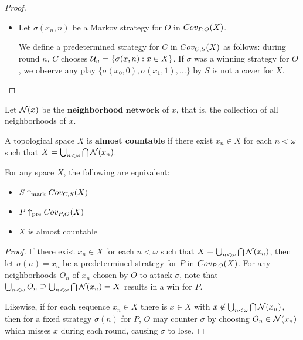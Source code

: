 \begin{proof}
\begin{itemize}
      \item
      Let $\sigma(x_n,n)$ be a Markov strategy for $O$ in $Cov_{P,O}(X)$.

      We define a predetermined strategy for $C$ in $Cov_{C,S}(X)$ as follows: during round $n$, $C$ chooses $\mathcal{U}_n = \{\sigma(x,n) : x\in X\}$. If $\sigma$ was a winning strategy for $O$, we observe any play $\{\sigma(x_0,0),\sigma(x_1,1),\dots\}$ by $S$ is not a cover for $X$.

    \end{itemize}

  \end{proof}

  \begin{definition}
    Let $\mathcal{N}(x)$ be the $\textbf{neighborhood network}$ of $x$, that is, the collection of all neighborhoods of $x$.
  \end{definition}

  \begin{definition}
    A topological space $X$ is \textbf{almost countable} if there exist $x_n\in X$ for each $n<\omega$ such that $X=\bigcup_{n<\omega}\bigcap\mathcal{N}(x_n)$.
  \end{definition}

  \begin{theorem}
    For any space $X$, the following are equivalent:
    \begin{itemize}
      \item $S\uparrow_{\text{mark}}Cov_{C,S}(X)$ 
      \item $P\uparrow_{\text{pre}}Cov_{P,O}(X)$
      \item $X$ is almost countable
    \end{itemize}
  \end{theorem}

  \begin{proof}
    If there exist $x_n\in X$ for each $n<\omega$ such that $X=\bigcup_{n<\omega}\bigcap\mathcal{N}(x_n)$, then let $\sigma(n)=x_n$ be a predetermined strategy for $P$ in $Cov_{P,O}(X)$. For any neighborhoods $O_n$ of $x_n$ chosen by $O$ to attack $\sigma$, note that $\bigcup_{n<\omega}O_n\supseteq\bigcup_{n<\omega}\bigcap\mathcal{N}(x_n)=X$ results in a win for $P$.

    Likewise, if for each sequence $x_n \in X$ there is $x\in X$ with $x\not\in \bigcup_{n<\omega}\bigcap\mathcal{N}(x_n)$, then for a fixed strategy $\sigma(n)$ for $P$, $O$ may counter $\sigma$ by choosing $O_n\in\mathcal{N}(x_n)$ which misses $x$ during each round, causing $\sigma$ to lose.
  \end{proof}

